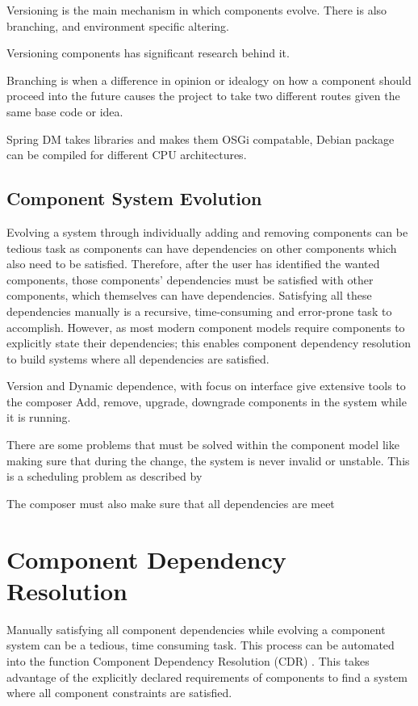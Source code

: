 Versioning is the main mechanism in which components evolve.
There is also branching, and environment specific altering.

Versioning components has significant research behind it.

Branching is when a difference in opinion or idealogy on how a component should proceed into the future
causes the project to take two different routes given the same base code or idea.

Spring DM takes libraries and makes them OSGi compatable, 
Debian package can be compiled for different CPU architectures.


\subsection{Component System Evolution}
Evolving a system through individually adding and removing components can be tedious task 
as components can have dependencies on other components which also need to be satisfied.
Therefore, after the user has identified the wanted components, 
those components' dependencies must be satisfied with other components, which themselves can have dependencies.
Satisfying all these dependencies manually is a recursive, time-consuming and error-prone task to accomplish.
However, as most modern component models require components to explicitly state their dependencies; 
this enables component dependency resolution to build systems where all dependencies are satisfied.

Version and Dynamic dependence, with focus on interface give extensive tools to the composer 
Add, remove, upgrade, downgrade components in the system while it is running.



There are some problems that must be solved within the component model like making sure that during the change,
the system is never invalid or unstable. 
This is a scheduling problem as described by %

The composer must also make sure that all dependencies are meet

\section{Component Dependency Resolution}
\label{background.cdr}
Manually satisfying all component dependencies while evolving a component system can be a tedious, time consuming task.
This process can be automated into the function Component Dependency Resolution (CDR) \cite{Jenson2010}.
This takes advantage of the explicitly declared requirements of components to find a system where all component constraints are satisfied.

